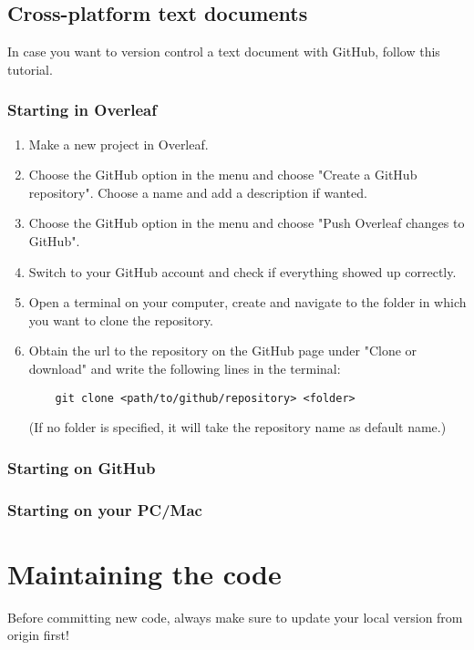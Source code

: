 \documentclass{article}
\begin{document}
\subsection{Cross-platform text documents}
In case you want to version control a text document with GitHub, follow this tutorial.

\subsubsection{Starting in Overleaf}

\begin{enumerate}
    \item Make a new project in Overleaf.
    \item Choose the GitHub option in the menu and choose "Create a GitHub repository". Choose a name and add a description if wanted.
    \item Choose the GitHub option in the menu and choose "Push Overleaf changes to GitHub".
    \item Switch to your GitHub account and check if everything showed up correctly.
    \item Open a terminal on your computer, create and navigate to the folder in which you want to clone the repository.
    \item Obtain the url to the repository on the GitHub page under "Clone or download" and write the following lines in the terminal: 
    \begin{verbatim}
    git clone <path/to/github/repository> <folder>
    \end{verbatim}
    (If no folder is specified, it will take the repository name as default name.)
\end{enumerate}

\subsubsection{Starting on GitHub}

\subsubsection{Starting on your PC/Mac}

\section{Maintaining the code}

Before committing new code, always make sure to update your local version from origin first!
\end{document}
